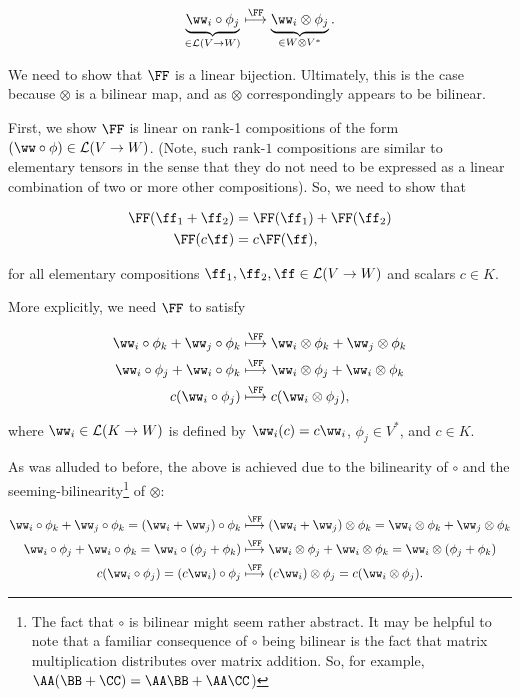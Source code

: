 \begin{align*}
    \underbrace{\ww_i \circ \phi_j}_{\in \LLLL(V \rightarrow W)} \overset{\FF}{\longmapsto} \underbrace{\ww_i \otimes \phi_j}_{\in W \otimes V^*}.
\end{align*}

We need to show that $\FF$ is a linear bijection. Ultimately, this is the case because $\otimes$ is a bilinear map, and as $\otimes$ correspondingly appears to be bilinear.

First, we show $\FF$ is linear on rank-1 compositions of the form $(\ww \circ \phi) \in \LLLL(V \rightarrow W)$. (Note, such ${\text{rank-1}}$ compositions are similar to elementary tensors in the sense that they do not need to be expressed as a linear combination of two or more other compositions). So, we need to show that

\begin{align*}
    \FF(\ff_1 + \ff_2) &= \FF(\ff_1) + \FF(\ff_2) \\
    \FF(c\ff) &= c\FF(\ff),
\end{align*}

for all elementary compositions $\ff_1, \ff_2, \ff \in \LLLL(V \rightarrow W)$ and scalars $c \in K$.

More explicitly, we need $\FF$ to satisfy

\begin{align*}
    \ww_i \circ \phi_k + \ww_j \circ \phi_k 
    &\overset{\FF}{\longmapsto}
    \ww_i \otimes \phi_k + \ww_j \otimes \phi_k
    \\
    \ww_i \circ \phi_j + \ww_i \circ \phi_k 
    &\overset{\FF}{\longmapsto}
    \ww_i \otimes \phi_j + \ww_i \otimes \phi_k
    \\
    c (\ww_i \circ \phi_j)
    &\overset{\FF}{\longmapsto}
    c (\ww_i \otimes \phi_j),
\end{align*}

where $\ww_i \in \LLLL(K \rightarrow W)$ is defined by $\ww_i(c) = c \ww_i$, $\phi_j \in V^*$, and $c \in K$.

As was alluded to before, the above is achieved due to the bilinearity of $\circ$ and the seeming-bilinearity\footnote{The fact that $\circ$ is bilinear might seem rather abstract. It may be helpful to note that a familiar consequence of $\circ$ being bilinear is the fact that matrix multiplication distributes over matrix addition. So, for example, $\AA(\BB + \CC) = \AA \BB + \AA \CC$)} of $\otimes$:

\begin{align*}
    \ww_i \circ \phi_k + \ww_j \circ \phi_k 
    = (\ww_i + \ww_j) \circ \phi_k
    &\overset{\FF}{\longmapsto}
    (\ww_i + \ww_j) \otimes \phi_k = \ww_i \otimes \phi_k + \ww_j \otimes \phi_k
    \\
    \ww_i \circ \phi_j + \ww_i \circ \phi_k 
    = \ww_i \circ (\phi_j + \phi_k)
    &\overset{\FF}{\longmapsto}
    \ww_i \otimes \phi_j + \ww_i \otimes \phi_k
    = \ww_i \otimes (\phi_j + \phi_k)
    \\
    c (\ww_i \circ \phi_j)
    = (c \ww_i) \circ \phi_j
    &\overset{\FF}{\longmapsto}
    (c \ww_i) \otimes \phi_j
    = c (\ww_i \otimes \phi_j).
\end{align*}

